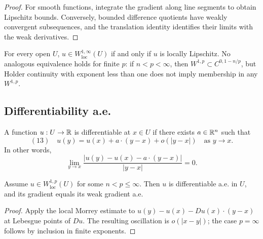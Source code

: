 \begin{proof}
\sketch For smooth functions, integrate the gradient along line segments to obtain Lipschitz bounds. Conversely, bounded difference quotients have weakly convergent subsequences, and the translation identity identifies their limits with the weak derivatives.
\end{proof}

\begin{remark}
\label{rem:local-lipschitz-w1infty-loc-remark}

For every open $U$, $u\in W^{1,\infty}_{\mathrm{loc}}(U)$ if and only if $u$ is locally Lipschitz.
No analogous equivalence holds for finite $p$: if $n<p<\infty$, then $W^{1,p}\subset C^{0,1-n/p}$, but Holder continuity with exponent less than one does not imply membership in any $W^{1,p}$.
\end{remark}

\subsection{Differentiability a.e.}

\begin{definition}
\label{def:differentiability-at-a-point}
A function $u: U \to \mathbb{R}$ is differentiable at $x \in U$ if there exists $a \in \mathbb{R}^n$ such that
$$(13) \quad u(y) = u(x) + a \cdot (y - x) + o(|y - x|) \quad \text{as } y \to x.$$
In other words,
$$\lim_{y \to x} \frac{|u(y) - u(x) - a \cdot (y - x)|}{|y - x|} = 0.$$
\end{definition}

\begin{theorem}
\label{thm:differentiability-almost-everywhere}

Assume $u \in W^{1,p}_{\text{loc}}(U)$ for some $n < p \le \infty$. Then $u$ is differentiable a.e. in $U$, and its gradient equals its weak gradient a.e.
\end{theorem}

\begin{proof}
\sketch Apply the local Morrey estimate to $u(y)-u(x)-Du(x)\cdot(y-x)$ at Lebesgue points of $Du$. The resulting oscillation is $o(|x-y|)$; the case $p=\infty$ follows by inclusion in finite exponents.
\end{proof}

